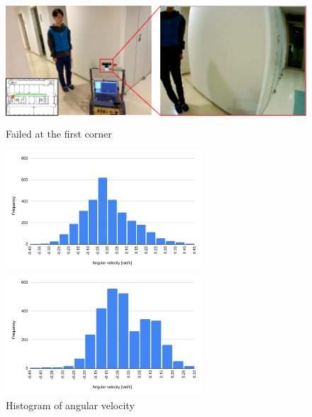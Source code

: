 \newpage

  \begin{figure}[h]
    \centering
    \includegraphics[keepaspectratio, scale=0.80] {images/RobotGuidance_failed_place.png}
    \captionsetup{justification=raggedright} %
    \caption{Failed at the first corner}
    \label{Fig:RobotGuidance_failed_place}
  \end{figure}

  \begin{figure}[h]
    \centering
    \begin{minipage}[c]{65mm} 
        \centering
        \includegraphics[height=45mm]{images/RobotGuidance_success_histogram.png}
    \end{minipage}
    \begin{minipage}[c]{65mm} 
        \centering
        \includegraphics[height=45mm]{images/RobotGuidance_failed_histogram.png}
    \end{minipage}
    \caption{Histogram of angular velocity}
    \label{Fig:Histogram of angular velocity}
  \end{figure}

\newpage
